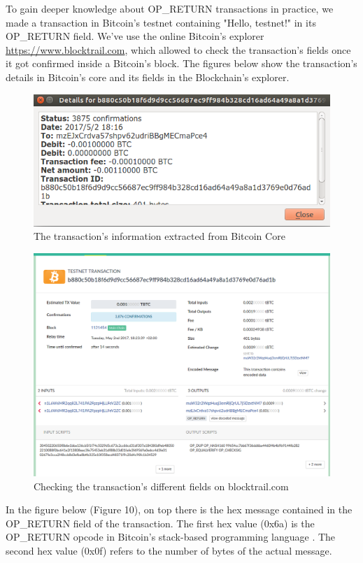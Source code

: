 To gain deeper knowledge about OP\_RETURN transactions in practice, we made a transaction in Bitcoin's testnet containing "Hello, testnet!" in its OP\_RETURN field. We've use the online Bitcoin's explorer \\ \url{https://www.blocktrail.com}, which allowed to check the transaction's fields once it got confirmed inside a Bitcoin's block. The figures below show the transaction's details in Bitcoin's core and its fields in the Blockchain's explorer.
\newpage
\begin{figure}[htp]
    \centering
    \includegraphics[scale=0.52]{op1}
    \caption{The transaction's information extracted from Bitcoin Core}
\end{figure} 
\begin{figure}[htp]
   \centering
    \includegraphics[scale=0.25]{op2}
    \hspace*{-2cm}
    \caption{Checking the transaction's different fields on blocktrail.com}
\end{figure} 
In the figure below (Figure 10), on top there is the hex message contained in the OP\_RETURN field of the transaction. The first hex value (0x6a) is the OP\_RETURN opcode in Bitcoin's stack-based programming language \cite{wikik}. The second hex value (0x0f) refers to the number of bytes of the actual message.
